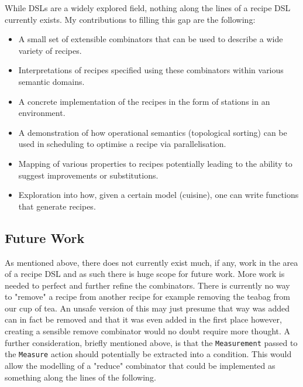 \documentclass[11pt]{article}
\begin{document}
While DSLs are a widely explored field, nothing along the lines of a recipe DSL
currently exists. My contributions to filling this gap are the following:

\begin{itemize}
    \item A small set of extensible combinators that can be used to describe a wide variety of recipes.

    \item Interpretations of recipes specified using these combinators within various semantic domains.

    \item A concrete implementation of the recipes in the form of stations in an environment.

    \item A demonstration of how operational semantics (topological sorting) can be used in
    scheduling to optimise a recipe via parallelisation.

    \item Mapping of various properties to recipes potentially leading to the ability
    to suggest improvements or substitutions.

    \item Exploration into how, given a certain model (cuisine), one can write functions that
    generate recipes.
\end{itemize}

\subsection{Future Work}

As mentioned above, there does not currently exist much, if any, work in the area of
a recipe DSL and as such there is huge scope for future work. More work is needed
to perfect and further refine the combinators. There is currently no way to
"remove" a recipe from another recipe for example removing the teabag from our cup of tea.
An unsafe version of this may just presume that way was added can in fact be removed
and that it was even added in the first place however, creating a sensible remove
combinator would no doubt require more thought. A further consideration, briefly mentioned
above, is that the \texttt{Measurement} passed to the \texttt{Measure} action should
potentially be extracted into a condition. This would allow the modelling of a "reduce"
combinator that could be implemented as something along the lines of the following.
\end{document}
